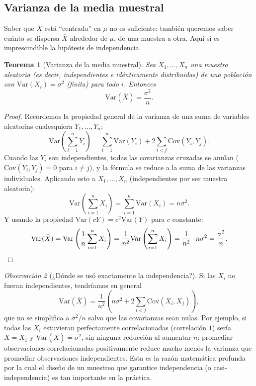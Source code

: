 \documentclass[11pt,a4paper]{article}
\theoremstyle{plain}
\newtheorem{teorema}{Teorema}[section]
\theoremstyle{definition}
\theoremstyle{remark}
\newtheorem{observacion}[teorema]{Observación}
\begin{document}
\subsection{Varianza de la media muestral}

Saber que $\bar X$ está ``centrada'' en $\mu$ no es suficiente: también queremos saber cuánto se dispersa $\bar X$ alrededor de $\mu$, de una muestra a otra. Aquí sí es imprescindible la hipótesis de independencia.

\begin{teorema}[Varianza de la media muestral]
\label{teo:varianza-xbarra}
Sea $X_1,\dots,X_n$ una muestra aleatoria (es decir, independientes e idénticamente distribuidas) de una población con $\mathrm{Var}(X_i)=\sigma^2$ (finita) para todo $i$. Entonces
$$\mathrm{Var}(\bar X) = \frac{\sigma^2}{n}.$$
\end{teorema}

\begin{proof}
Recordemos la propiedad general de la varianza de una suma de variables aleatorias cualesquiera $Y_1,\dots,Y_n$:
$$\mathrm{Var}\left(\sum_{i=1}^n Y_i\right) = \sum_{i=1}^n \mathrm{Var}(Y_i) + 2\sum_{i<j}\mathrm{Cov}(Y_i,Y_j).$$
Cuando las $Y_i$ son independientes, todas las covarianzas cruzadas se anulan ($\mathrm{Cov}(Y_i,Y_j)=0$ para $i\neq j$), y la fórmula se reduce a la suma de las varianzas individuales. Aplicando esto a $X_1,\dots,X_n$ (independientes por ser muestra aleatoria):
$$\mathrm{Var}\left(\sum_{i=1}^n X_i\right) = \sum_{i=1}^n \mathrm{Var}(X_i) = n\sigma^2.$$
Y usando la propiedad $\mathrm{Var}(cY) = c^2\mathrm{Var}(Y)$ para $c$ constante:
$$\mathrm{Var}(\bar X) = \mathrm{Var}\left(\frac{1}{n}\sum_{i=1}^n X_i\right) = \frac{1}{n^2}\mathrm{Var}\left(\sum_{i=1}^n X_i\right) = \frac{1}{n^2}\cdot n\sigma^2 = \frac{\sigma^2}{n}. \qedhere$$
\end{proof}

\begin{observacion}[¿Dónde se usó exactamente la independencia?]
Si las $X_i$ no fueran independientes, tendríamos en general
$$\mathrm{Var}(\bar X) = \frac{1}{n^2}\left(n\sigma^2 + 2\sum_{i<j}\mathrm{Cov}(X_i,X_j)\right),$$
que no se simplifica a $\sigma^2/n$ salvo que las covarianzas sean nulas. Por ejemplo, si todas las $X_i$ estuvieran perfectamente correlacionadas (correlación $1$) sería $\bar X = X_1$ y $\mathrm{Var}(\bar X)=\sigma^2$, sin ninguna reducción al aumentar $n$: promediar observaciones correlacionadas positivamente reduce mucho menos la varianza que promediar observaciones independientes. Esta es la razón matemática profunda por la cual el diseño de un muestreo que garantice independencia (o casi-independencia) es tan importante en la práctica.
\end{observacion}
\end{document}
